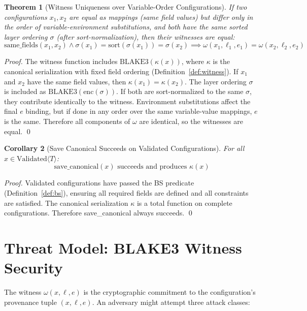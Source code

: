 \documentclass[12pt, letterpaper]{report}
\theoremstyle{plain}
\newtheorem{theorem}{Theorem}[chapter]
\newtheorem{corollary}[theorem]{Corollary}
\theoremstyle{definition}
\theoremstyle{remark}
\begin{document}
\begin{theorem}[Witness Uniqueness over Variable-Order Configurations]
\label{thm:witness-order-independence}
If two configurations $x_1, x_2$ are equal as mappings (same field values)
but differ only in the order of variable-environment substitutions,
and both have the same sorted layer ordering $\sigma$ (after sort-normalization),
then their witnesses are equal:
\[
  \mathrm{same\_fields}(x_1, x_2)
  \land \sigma(x_1) = \mathrm{sort}(\sigma(x_1)) = \sigma(x_2)
  \implies \omega(x_1, \ell_1, e_1) = \omega(x_2, \ell_2, e_2)
\]
\end{theorem}

\begin{proof}
The witness function includes $\mathrm{BLAKE3}(\kappa(x))$, where $\kappa$ is
the canonical serialization with fixed field ordering (Definition~\ref{def:witness}).
If $x_1$ and $x_2$ have the same field values, then $\kappa(x_1) = \kappa(x_2)$.
The layer ordering $\sigma$ is included as $\mathrm{BLAKE3}(\mathrm{enc}(\sigma))$.
If both are sort-normalized to the same $\sigma$, they contribute identically
to the witness. Environment substitutions affect the final $e$ binding, but
if done in any order over the same variable-value mappings, $e$ is the same.
Therefore all components of $\omega$ are identical, so the witnesses are equal. \qed
\end{proof}

\begin{corollary}[Save Canonical Succeeds on Validated Configurations]
For all $x \in \mathrm{Validated}\langle T\rangle$:
\[
  \mathrm{save\_canonical}(x) \text{ succeeds and produces } \kappa(x)
\]
\end{corollary}

\begin{proof}
Validated configurations have passed the BS predicate (Definition~\ref{def:bs}),
ensuring all required fields are defined and all constraints are satisfied.
The canonical serialization $\kappa$ is a total function on complete configurations.
Therefore save_canonical always succeeds. \qed
\end{proof}

\section{Threat Model: BLAKE3 Witness Security}

The witness $\omega(x, \ell, e)$ is the cryptographic commitment to the
configuration's provenance tuple $(x, \ell, e)$. An adversary might attempt
three attack classes:
\end{document}
